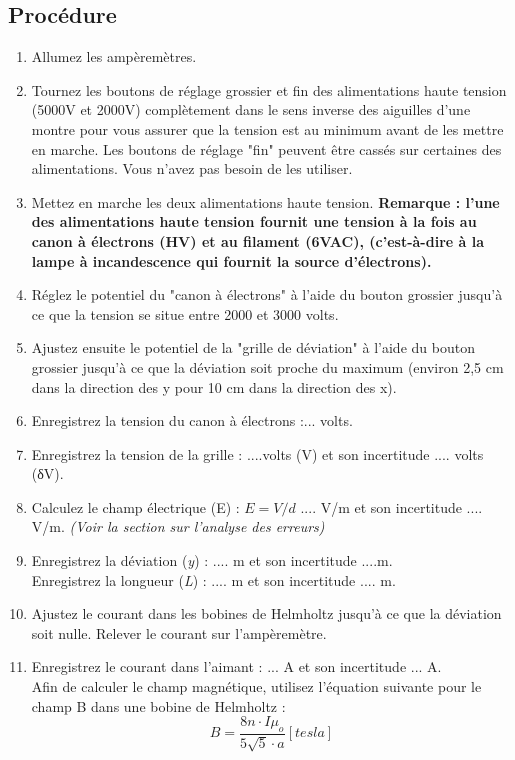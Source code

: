 \documentclass[../main.tex]{subfiles}
\begin{document}
\subsection{Procédure}
\begin{enumerate}
    \item Allumez les ampèremètres. 
    \item Tournez les boutons de réglage grossier et fin des alimentations haute tension (5000V et 2000V) complètement dans le sens inverse des aiguilles d'une montre pour vous assurer que la tension est au minimum avant de les mettre en marche.  Les boutons de réglage "fin" peuvent être cassés sur certaines des alimentations.  Vous n'avez pas besoin de les utiliser. 
    \item Mettez en marche les deux alimentations haute tension.  \textbf{Remarque : l'une des alimentations haute tension fournit une tension à la fois au canon à électrons (HV) et au filament (6VAC), (c'est-à-dire à la lampe à incandescence qui fournit la source d'électrons). }
    \item Réglez le potentiel du "canon à électrons" à l'aide du bouton grossier jusqu'à ce que la tension se situe entre 2000 et 3000 volts. 
    \item Ajustez ensuite le potentiel de la "grille de déviation" à l'aide du bouton grossier jusqu'à ce que la déviation soit proche du maximum (environ 2,5 cm dans la direction des y pour 10 cm dans la direction des x).  
    \item Enregistrez la tension du canon à électrons :... volts.  
    \item Enregistrez la tension de la grille : ....volts (V) et son incertitude .... volts (δV).  
    \item Calculez le champ électrique (E) :  $E=V/d$ .... V/m et son incertitude .... V/m.  \textit{(Voir la section sur l'analyse des erreurs)}
    \item Enregistrez la déviation (\textit{y}) : .... m et son incertitude ....m.\\ Enregistrez la longueur (\textit{L}) :   .... m et son incertitude .... m. 
    \item Ajustez le courant dans les bobines de Helmholtz jusqu'à ce que la déviation soit nulle.  Relever le courant sur l'ampèremètre.  
    \item Enregistrez le courant dans l'aimant : ... A et son incertitude ... A. \\
Afin de calculer le champ magnétique, utilisez l'équation suivante pour le champ B dans une bobine de Helmholtz :\\ $$B = \frac{8n \cdot I \mu_o}{5 \sqrt{5} \cdot a} [tesla]$$

\end{enumerate}
\end{document}
